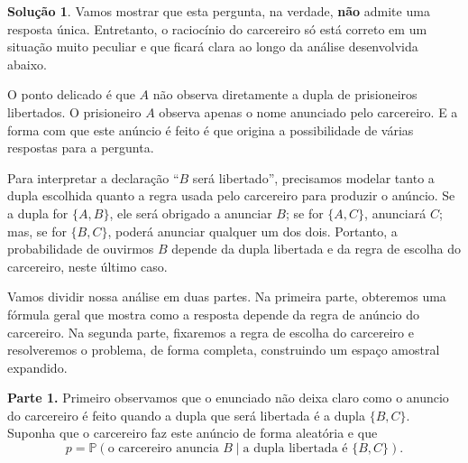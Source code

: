 \documentclass[12pt,portuguese]{article}
\theoremstyle{definition}
\newtheorem*{solution}{Solução}
\begin{document}
\begin{solution}
Vamos mostrar que esta pergunta, na verdade, \textbf{não} admite uma resposta única.
Entretanto, o raciocínio do carcereiro só está correto em um situação muito peculiar
e que ficará clara ao longo da análise desenvolvida abaixo.

\medskip 

O ponto delicado é que \(A\) não observa diretamente a dupla de prisioneiros libertados. 
O prisioneiro $A$ observa apenas o nome anunciado pelo carcereiro.
E a forma com que este anúncio é feito é que origina a possibilidade de várias respostas
para a pergunta.

\medskip 
 
Para interpretar a declaração ``\(B\) será libertado'', precisamos 
modelar tanto a dupla escolhida quanto a regra usada pelo carcereiro para 
produzir o anúncio. Se a dupla for \(\{A,B\}\), ele será obrigado 
a anunciar \(B\); se for \(\{A,C\}\), anunciará \(C\); mas, se for \(\{B,C\}\), 
poderá anunciar qualquer um dos dois. Portanto, a probabilidade de ouvirmos 
\(B\) depende da dupla libertada e da regra de escolha do carcereiro, neste último caso.

\medskip 

Vamos dividir nossa análise em duas partes. 
Na primeira parte, obteremos uma fórmula geral que mostra como a resposta depende da regra
de anúncio do carcereiro. 
Na segunda parte, fixaremos a regra de escolha do carcereiro e resolveremos o 
problema, de forma completa, construindo um espaço amostral expandido.

\smallskip
\noindent\textbf{Parte 1.}
Primeiro observamos que o enunciado não deixa claro como o anuncio do carcereiro
é feito quando a dupla que será libertada é a dupla $\{B,C\}$. Suponha que o carcereiro
faz este anúncio de forma aleatória e que
\[
  p = \mathbb{P}(\text{o carcereiro anuncia } B \mid \text{a dupla libertada é } \{B,C\}).
\]


\end{solution}
\end{document}
